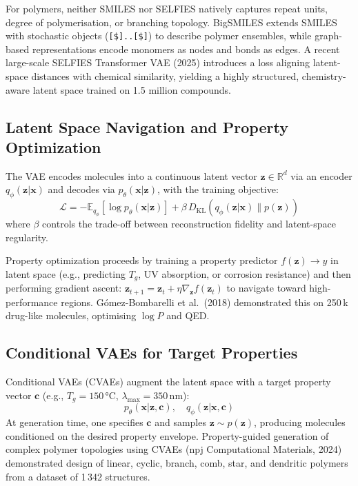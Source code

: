 \documentclass[11pt,a4paper]{article}
\begin{document}
For polymers, neither SMILES nor SELFIES natively captures repeat units, degree of polymerisation, or branching topology.
BigSMILES extends SMILES with stochastic objects (\texttt{[\$]..[\$]}) to describe polymer ensembles, while graph-based representations encode monomers as nodes and bonds as edges.
A recent large-scale SELFIES Transformer VAE (2025) introduces a loss aligning latent-space distances with chemical similarity, yielding a highly structured, chemistry-aware latent space trained on 1.5 million compounds.

\subsection{Latent Space Navigation and Property Optimization}

The VAE encodes molecules into a continuous latent vector $\mathbf{z} \in \mathbb{R}^d$ via an encoder $q_\phi(\mathbf{z}|\mathbf{x})$ and decodes via $p_\theta(\mathbf{x}|\mathbf{z})$, with the training objective:
\begin{equation}
\mathcal{L} = -\mathbb{E}_{q_\phi}[\log p_\theta(\mathbf{x}|\mathbf{z})] + \beta \, D_\text{KL}(q_\phi(\mathbf{z}|\mathbf{x}) \| p(\mathbf{z}))
\end{equation}
where $\beta$ controls the trade-off between reconstruction fidelity and latent-space regularity.

Property optimization proceeds by training a property predictor $f(\mathbf{z}) \to y$ in latent space (e.g., predicting $T_g$, UV absorption, or corrosion resistance) and then performing gradient ascent:
$\mathbf{z}_{t+1} = \mathbf{z}_t + \eta \nabla_{\mathbf{z}} f(\mathbf{z}_t)$
to navigate toward high-performance regions.
Gómez-Bombarelli et al.\ (2018) demonstrated this on 250\,k drug-like molecules, optimising $\log P$ and QED.

\subsection{Conditional VAEs for Target Properties}

Conditional VAEs (CVAEs) augment the latent space with a target property vector $\mathbf{c}$ (e.g., $T_g = 150\,°$C, $\lambda_\text{max} = 350\,$nm):
\begin{equation}
p_\theta(\mathbf{x}|\mathbf{z}, \mathbf{c}), \quad q_\phi(\mathbf{z}|\mathbf{x}, \mathbf{c})
\end{equation}
At generation time, one specifies $\mathbf{c}$ and samples $\mathbf{z} \sim p(\mathbf{z})$, producing molecules conditioned on the desired property envelope.
Property-guided generation of complex polymer topologies using CVAEs (npj Computational Materials, 2024) demonstrated design of linear, cyclic, branch, comb, star, and dendritic polymers from a dataset of 1\,342 structures.
\end{document}
